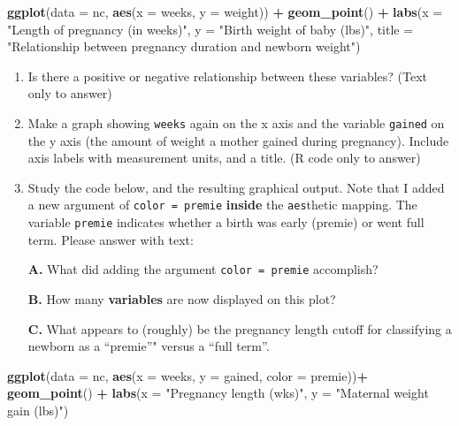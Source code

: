 \documentclass[]{article}
\newenvironment{Shaded}{\begin{snugshade}}{\end{snugshade}}
\newcommand{\DataTypeTok}[1]{\textcolor[rgb]{0.13,0.29,0.53}{#1}}
\newcommand{\KeywordTok}[1]{\textcolor[rgb]{0.13,0.29,0.53}{\textbf{#1}}}
\newcommand{\NormalTok}[1]{#1}
\newcommand{\OperatorTok}[1]{\textcolor[rgb]{0.81,0.36,0.00}{\textbf{#1}}}
\newcommand{\StringTok}[1]{\textcolor[rgb]{0.31,0.60,0.02}{#1}}
\begin{document}
\begin{Shaded}
\begin{Highlighting}[]
\KeywordTok{ggplot}\NormalTok{(}\DataTypeTok{data =}\NormalTok{ nc, }\KeywordTok{aes}\NormalTok{(}\DataTypeTok{x =}\NormalTok{ weeks, }\DataTypeTok{y =}\NormalTok{ weight)) }\OperatorTok{+}\StringTok{ }
\StringTok{  }\KeywordTok{geom_point}\NormalTok{() }\OperatorTok{+}\StringTok{ }
\StringTok{  }\KeywordTok{labs}\NormalTok{(}\DataTypeTok{x =} \StringTok{"Length of pregnancy (in weeks)"}\NormalTok{, }\DataTypeTok{y =} \StringTok{"Birth weight of baby (lbs)"}\NormalTok{, }
       \DataTypeTok{title =} \StringTok{"Relationship between pregnancy duration and newborn weight"}\NormalTok{)}
\end{Highlighting}
\end{Shaded}

\begin{enumerate}
\def\labelenumi{\arabic{enumi}.}
\item
  Is there a positive or negative relationship between these variables?
  (Text only to answer)
\item
  Make a graph showing \texttt{weeks} again on the x axis and the
  variable \texttt{gained} on the y axis (the amount of weight a mother
  gained during pregnancy). Include axis labels with measurement units,
  and a title. (R code only to answer)
\item
  Study the code below, and the resulting graphical output. Note that I
  added a new argument of \texttt{color\ =\ premie} \textbf{inside} the
  \texttt{aes}thetic mapping. The variable \texttt{premie} indicates
  whether a birth was early (premie) or went full term. Please answer
  with text:

  \textbf{A.} What did adding the argument \texttt{color\ =\ premie}
  accomplish?

  \textbf{B.} How many \textbf{variables} are now displayed on this
  plot?

  \textbf{C.} What appears to (roughly) be the pregnancy length cutoff
  for classifying a newborn as a ``premie''" versus a ``full term''.
\end{enumerate}

\begin{Shaded}
\begin{Highlighting}[]
\KeywordTok{ggplot}\NormalTok{(}\DataTypeTok{data =}\NormalTok{ nc, }\KeywordTok{aes}\NormalTok{(}\DataTypeTok{x =}\NormalTok{ weeks, }\DataTypeTok{y =}\NormalTok{ gained, }\DataTypeTok{color =}\NormalTok{ premie))}\OperatorTok{+}\StringTok{ }
\StringTok{  }\KeywordTok{geom_point}\NormalTok{() }\OperatorTok{+}\StringTok{ }
\StringTok{  }\KeywordTok{labs}\NormalTok{(}\DataTypeTok{x =} \StringTok{"Pregnancy length (wks)"}\NormalTok{, }\DataTypeTok{y =} \StringTok{"Maternal weight gain (lbs)"}\NormalTok{)}
\end{Highlighting}
\end{Shaded}
\end{document}
